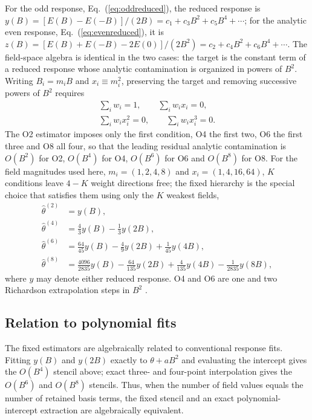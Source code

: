 \documentclass[aps,prd,preprint,nofootinbib,floatfix]{revtex4-2}
\begin{document}
For the odd response, Eq.~(\ref{eq:oddreduced}), the reduced response is $y(B)=[E(B)-E(-B)]/(2B)=c_1+c_3B^2+c_5B^4+\cdots$; for the analytic even response, Eq.~(\ref{eq:evenreduced}), it is $z(B)=[E(B)+E(-B)-2E(0)]/(2B^2)=c_2+c_4B^2+c_6B^4+\cdots$. The field-space algebra is identical in the two cases: the target is the constant term of a reduced response whose analytic contamination is organized in powers of $B^2$. Writing $B_i=m_iB$ and $x_i\equiv m_i^2$, preserving the target and removing successive powers of $B^2$ requires
\begin{equation}
\begin{gathered}
\sum_i w_i = 1,\qquad
\sum_i w_i x_i = 0,\\
\sum_i w_i x_i^2 = 0,\qquad
\sum_i w_i x_i^3 = 0.
\end{gathered}
\label{eq:sum_constraint}
\end{equation}
The O2 estimator imposes only the first condition, O4 the first two, O6 the first three and O8 all four, so that the leading residual analytic contamination is $O(B^2)$ for O2, $O(B^4)$ for O4, $O(B^6)$ for O6 and $O(B^8)$ for O8. For the field magnitudes used here, $m_i=(1,2,4,8)$ and $x_i=(1,4,16,64)$, $K$ conditions leave $4-K$ weight directions free; the fixed hierarchy is the special choice that satisfies them using only the $K$ weakest fields,
\begin{align}
\widehat\theta^{(2)} &= y(B),\nonumber\\
\widehat\theta^{(4)} &= \tfrac43y(B)-\tfrac13y(2B),\nonumber\\
\widehat\theta^{(6)} &= \tfrac{64}{45}y(B)-\tfrac49y(2B)+\tfrac1{45}y(4B),\nonumber\\
\widehat\theta^{(8)} &= \tfrac{4096}{2835}y(B)-\tfrac{64}{135}y(2B)+\tfrac4{135}y(4B)-\tfrac1{2835}y(8B),
\label{eq:fixedhierarchy}
\end{align}
where $y$ may denote either reduced response. O4 and O6 are one and two Richardson extrapolation steps in $B^2$ \cite{Richardson1927}.

\subsection{Relation to polynomial fits}

The fixed estimators are algebraically related to conventional response fits. Fitting $y(B)$ and $y(2B)$ exactly to $\theta+aB^2$ and evaluating the intercept gives the $O(B^4)$ stencil above; exact three- and four-point interpolation gives the $O(B^6)$ and $O(B^8)$ stencils. Thus, when the number of field values equals the number of retained basis terms, the fixed stencil and an exact polynomial-intercept extraction are algebraically equivalent.
\end{document}
